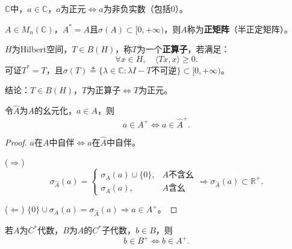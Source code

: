 \documentclass[lang=cn,a4paper,newtx,section]{elegantbook}
\begin{document}
\begin{example}
  $\mathbb{C}$中，$a \in \mathbb{C}$，$a$为正元$\Longleftrightarrow a$为非负实数（包括$0$）。
\end{example}

\begin{example}
  $A \in M_n(\mathbb{C})$，$A^* = A$且$\sigma(A) \subset [0, +\infty)$，则$A$称为\textbf{正矩阵}（半正定矩阵）。
\end{example}

\begin{example}
  $H$为Hilbert空间，$T \in B(H)$，称$T$为一个\textbf{正算子}，若满足：
  \begin{equation*}
    \forall x \in H, \quad \langle Tx, x \rangle \geq 0.
  \end{equation*}
  可证$T^* = T$，且$\sigma(T) \triangleq \{\lambda \in \mathbb{C} : \lambda I - T \text{不可逆}\} \subset [0, +\infty)$。
  
  结论：$T \in B(H)$，$T$为正算子$\Longleftrightarrow T$为正元。
\end{example}

\begin{proposition}
  令$\hat{A}$为$A$的幺元化，$a \in A$，则
  \begin{equation*}
    a \in A^+ \Longleftrightarrow a \in \hat{A}^+.
  \end{equation*}
\end{proposition}

\begin{proof}
  $a$在$A$中自伴$\Longleftrightarrow a$在$\hat{A}$中自伴。
  
  ($\Rightarrow$) 
  \begin{equation*}
    \sigma_{\hat{A}}(a) = \begin{cases}
      \sigma_A(a) \cup \{0\}, & A\text{不含幺} \\
      \sigma_A(a), & A\text{含幺}
    \end{cases}
    \Rightarrow \sigma_{\hat{A}}(a) \subset \mathbb{R}^+.
  \end{equation*}
  
  ($\Leftarrow$) $\{0\} \cup \sigma_A(a) = \sigma_{\hat{A}}(a) \Rightarrow a \in A^+$。
\end{proof}

\begin{proposition}
  若$A$为$C^*$代数，$B$为$A$的$C^*$子代数，$b \in B$，则
  \begin{equation*}
    b \in B^+ \Longleftrightarrow b \in A^+.
  \end{equation*}
\end{proposition}
\end{document}
